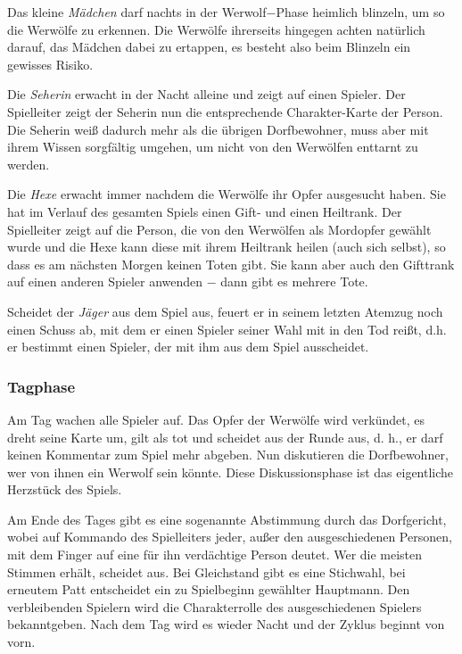 \documentclass[12pt, a4paper]{article}
\begin{document}
Das kleine \textit{Mädchen} darf nachts in der Werwolf$-$Phase heimlich blinzeln, um so die Werwölfe zu
erkennen. Die Werwölfe ihrerseits hingegen achten natürlich darauf, das Mädchen dabei zu ertappen,
es besteht also beim Blinzeln ein gewisses Risiko.

\vspace{0,3 cm}

Die \textit{Seherin} erwacht in der Nacht alleine und zeigt auf einen Spieler.
Der Spielleiter zeigt der Seherin nun die entsprechende Charakter-Karte der Person.
Die Seherin weiß dadurch mehr als die übrigen Dorfbewohner, muss aber mit ihrem Wissen
sorgfältig umgehen, um nicht von den Werwölfen enttarnt zu werden.

\vspace{0,3 cm}

Die \textit{Hexe} erwacht immer nachdem die Werwölfe ihr Opfer ausgesucht haben.
Sie hat im Verlauf des gesamten Spiels einen Gift- und einen Heiltrank.
Der Spielleiter zeigt auf die Person, die von den Werwölfen als Mordopfer gewählt wurde und die
Hexe kann diese mit ihrem Heiltrank heilen (auch sich selbst), so dass es am nächsten Morgen keinen
Toten gibt. Sie kann aber auch den Gifttrank auf einen anderen Spieler anwenden $-$ dann gibt es mehrere Tote.

\vspace{0,3 cm} 

Scheidet der \textit{Jäger} aus dem Spiel aus, feuert er in seinem letzten Atemzug noch einen Schuss ab,
mit dem er einen Spieler seiner Wahl mit in den Tod reißt, d.h. er bestimmt einen Spieler,
der mit ihm aus dem Spiel ausscheidet.


		\subsubsection{Tagphase}
Am Tag wachen alle Spieler auf. Das Opfer der Werwölfe wird verkündet, es dreht seine Karte um,
gilt als tot und scheidet aus der Runde aus, d. h., er darf keinen Kommentar zum Spiel mehr abgeben.
Nun diskutieren die Dorfbewohner, wer von ihnen ein Werwolf sein könnte. Diese Diskussionsphase
ist das eigentliche Herzstück des Spiels.

\vspace{0,3 cm}
Am Ende des Tages gibt es eine sogenannte Abstimmung durch das Dorfgericht, wobei auf Kommando des
Spielleiters jeder, außer den ausgeschiedenen Personen, mit dem Finger auf eine für ihn verdächtige
Person deutet. Wer die meisten Stimmen erhält, scheidet aus. Bei Gleichstand gibt es eine Stichwahl,
bei erneutem Patt entscheidet ein zu Spielbeginn gewählter Hauptmann. Den verbleibenden Spielern
wird die Charakterrolle des ausgeschiedenen Spielers bekanntgeben. Nach dem Tag wird es wieder
Nacht und der Zyklus beginnt von vorn.
\end{document}
